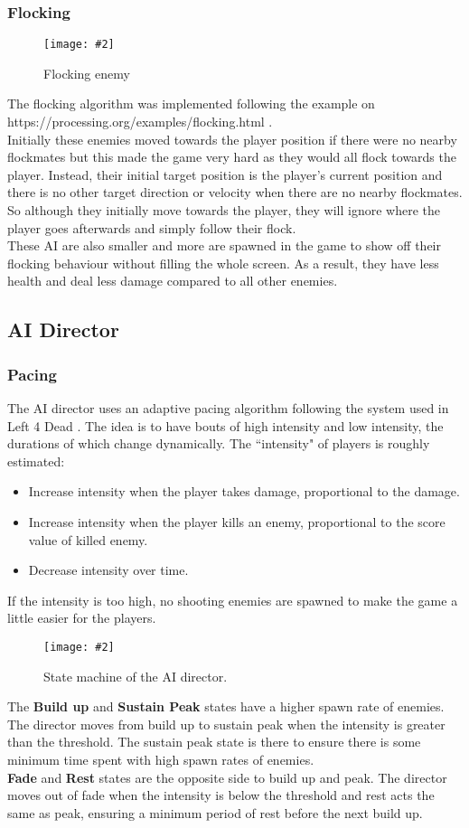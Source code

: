 \documentclass{article}
\newcommand{\n}[0]{\\[\baselineskip]}
\newcommand{\figimg}[3]{
  \begin{figure}[H]
    \centering
    \texttt{[image: \#2]}
    \caption{#3}
  \end{figure}
  \noindent 
}
\begin{document}
\subsubsection{Flocking}
\figimg{0.1}{imgs/FlockingEnemy.png}{Flocking enemy}
The flocking algorithm was implemented following the example on https://processing.org/examples/flocking.html \cite{flocking}. 
\n
Initially these enemies moved towards the player position if there were no nearby flockmates but this made the game very hard as they would all flock towards the player. Instead, their initial target position is the player's current position and there is no other target direction or velocity when there are no nearby flockmates. So although they initially move towards the player, they will ignore where the player goes afterwards and simply follow their flock.
\n
These AI are also smaller and more are spawned in the game to show off their flocking behaviour without filling the whole screen. As a result, they have less health and deal less damage compared to all other enemies.

\subsection{AI Director}
\subsubsection{Pacing}
The AI director uses an adaptive pacing algorithm following the system used in Left 4 Dead \cite{l4d}. The idea is to have bouts of high intensity and low intensity, the durations of which change dynamically. The ``intensity" of players is roughly estimated:
\begin{itemize}
\item Increase intensity when the player takes damage, proportional to the damage.
\item Increase intensity when the player kills an enemy, proportional to the score value of killed enemy.
\item Decrease intensity over time. 
\end{itemize}
\noindent
If the intensity is too high, no shooting enemies are spawned to make the game a little easier for the players.

\figimg{0.7}{imgs/DirectorFSM.png}{State machine of the AI director.}
The \textbf{Build up} and \textbf{Sustain Peak} states have a higher spawn rate of enemies. The director moves from build up to sustain peak when the intensity is greater than the threshold. The sustain peak state is there to ensure there is some minimum time spent with high spawn rates of enemies. 
\n
\textbf{Fade} and \textbf{Rest} states are the opposite side to build up and peak. The director moves out of fade when the intensity is below the threshold and rest acts the same as peak, ensuring a minimum period of rest before the next build up.
\end{document}
